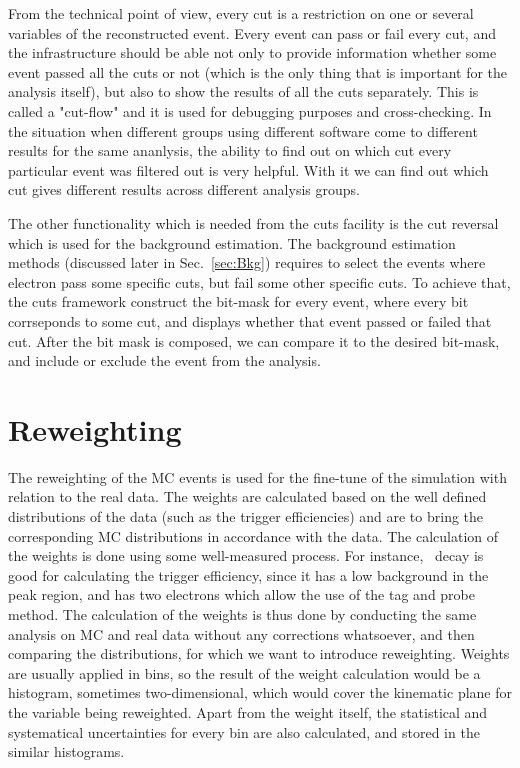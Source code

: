 From the technical point of view, every cut is a restriction on one or several variables of the reconstructed event. Every event can pass or fail every cut, and the infrastructure should be able not only to provide information whether some event passed all the cuts or not (which is the only thing that is important for the analysis itself), but also to show the results of all the cuts separately. This is called a "cut-flow" and it is used for debugging purposes and cross-checking. In the situation when different groups using different software come to different results for the same ananlysis, the ability to find out on which cut every particular event was filtered out is very helpful. With it we can find out which cut gives different results across different analysis groups.

The other functionality which is needed from the cuts facility is the cut reversal which is used for the background estimation. The background estimation methods (discussed later in Sec.~\ref{sec:Bkg}) requires to select the events where electron pass some specific cuts, but fail some other specific cuts. To achieve that, the cuts framework construct the bit-mask for every event, where every bit corrseponds to some cut, and displays whether that event passed or failed that cut. After the bit mask is composed, we can compare it to the desired bit-mask, and include or exclude the event from the analysis.

\section{Reweighting}

The reweighting of the MC events is used for the fine-tune of the simulation with relation to the real data. The weights are calculated based on the well defined distributions of the data (such as the trigger efficiencies) and are to bring the corresponding MC distributions in accordance with the data. The calculation of the weights is done using some well-measured process. For instance, \Zee\ decay is good for calculating the trigger efficiency, since it has a low background in the peak region, and has two electrons which allow the use of the tag and probe method. The calculation of the weights is thus done by conducting the same analysis on MC and real data without any corrections whatsoever, and then comparing the distributions, for which we want to introduce reweighting. Weights are usually applied in bins, so the result of the weight calculation would be a histogram, sometimes two-dimensional, which would cover the kinematic plane for the variable being reweighted. Apart from the weight itself, the statistical and systematical uncertainties for every bin are also calculated, and stored in the similar histograms.

